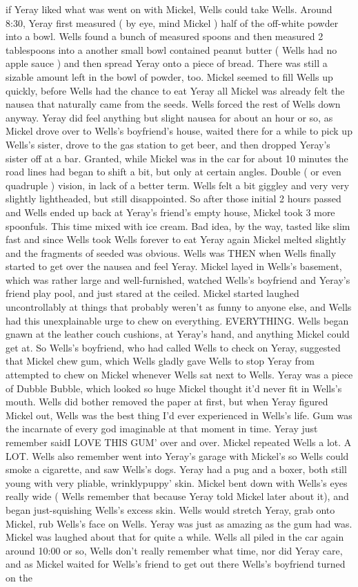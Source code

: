 \documentclass[12pt]{book}
\begin{document}
if Yeray liked what was went on with Mickel, Wells could take Wells. Around 8:30, Yeray first measured ( by eye, mind Mickel ) half of the off-white powder into a bowl. Wells found a bunch of measured spoons and then measured 2 tablespoons into a another small bowl contained peanut butter ( Wells had no apple sauce ) and then spread Yeray onto a piece of bread. There was still a sizable amount left in the bowl of powder, too. Mickel seemed to fill Wells up quickly, before Wells had the chance to eat Yeray all Mickel was already felt the nausea that naturally came from the seeds. Wells forced the rest of Wells down anyway. Yeray did feel anything but slight nausea for about an hour or so, as Mickel drove over to Wells's boyfriend's house, waited there for a while to pick up Wells's sister, drove to the gas station to get beer, and then dropped Yeray's sister off at a bar. Granted, while Mickel was in the car for about 10 minutes the road lines had began to shift a bit, but only at certain angles. Double ( or even quadruple ) vision, in lack of a better term. Wells felt a bit giggley and very very slightly lightheaded, but still disappointed. So after those initial 2 hours passed and Wells ended up back at Yeray's friend's empty house, Mickel took 3 more spoonfuls. This time mixed with ice cream. Bad idea, by the way, tasted like slim fast and since Wells took Wells forever to eat Yeray again Mickel melted slightly and the fragments of seeded was obvious. Wells was THEN when Wells finally started to get over the nausea and feel Yeray. Mickel layed in Wells's basement, which was rather large and well-furnished, watched Wells's boyfriend and Yeray's friend play pool, and just stared at the ceiled. Mickel started laughed uncontrollably at things that probably weren't as funny to anyone else, and Wells had this unexplainable urge to chew on everything. EVERYTHING. Wells began gnawn at the leather couch cushions, at Yeray's hand, and anything Mickel could get at. So Wells's boyfriend, who had called Wells to check on Yeray, suggested that Mickel chew gum, which Wells gladly gave Wells to stop Yeray from attempted to chew on Mickel whenever Wells sat next to Wells. Yeray was a piece of Dubble Bubble, which looked so huge Mickel thought it'd never fit in Wells's mouth. Wells did bother removed the paper at first, but when Yeray figured Mickel out, Wells was the best thing I'd ever experienced in Wells's life. Gum was the incarnate of every god imaginable at that moment in time. Yeray just remember saidI LOVE THIS GUM' over and over. Mickel repeated Wells a lot. A LOT. Wells also remember went into Yeray's garage with Mickel's so Wells could smoke a cigarette, and saw Wells's dogs. Yeray had a pug and a boxer, both still young with very pliable, wrinklypuppy' skin. Mickel bent down with Wells's eyes really wide ( Wells remember that because Yeray told Mickel later about it), and began just-squishing Wells's excess skin. Wells would stretch Yeray, grab onto Mickel, rub Wells's face on Wells. Yeray was just as amazing as the gum had was. Mickel was laughed about that for quite a while. Wells all piled in the car again around 10:00 or so, Wells don't really remember what time, nor did Yeray care, and as Mickel waited for Wells's friend to get out there Wells's boyfriend turned on the 
\end{document}

